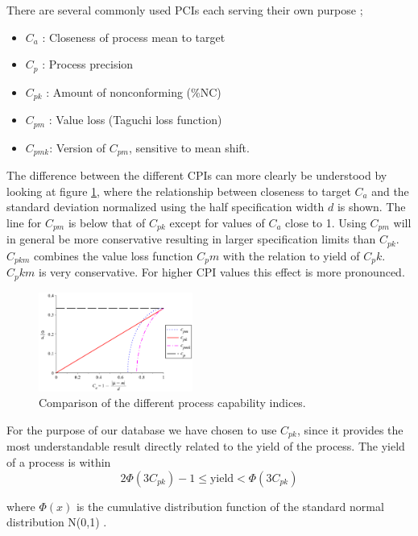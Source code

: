 \documentclass[aip,amsmath, reprint, author-year]{revtex4-1}
\begin{document}
There are several commonly used PCIs each serving their own purpose  \citep{wu2009overview, taguchi1986introduction};
\begin{itemize}
	\item $C_a$ : Closeness of process mean to target 
	\item $C_p$ : Process precision 
	\item $C_{pk}$ : Amount of nonconforming (\%NC)
	\item $C_{pm}$ : Value loss (Taguchi loss function)
	\item $C_{pmk}$: Version of $C_{pm}$,  sensitive to mean shift. 
\end{itemize}

The difference between the different CPIs can more clearly be understood by looking at figure \ref{fig:CPI}, where the relationship between closeness to target $C_a$ and the standard deviation \sigma normalized using the half specification width $d$ is shown. The line for $C_{pm}$ is below that of $C_{pk}$ except for values of $C_a$ close to 1. Using $C_{pm}$ will in general be more conservative resulting in larger specification limits than $C_{pk}$. $C_{pkm}$ combines the value loss function $C_pm$ with the relation to yield of $C_pk$. $C_pkm$ is very conservative. For higher CPI values this effect is more pronounced.


\begin{figure}
\includegraphics[width=0.45\textwidth]{cpm_cpk.pdf}
\caption{\label{fig:CPI} Comparison of the different process capability indices.  }
\end{figure}

For the purpose of our database we have chosen to use $C_{pk}$, since it provides the most understandable result directly related to the yield of the process. The yield of a process is within
\begin{equation}
	2\Phi(3C_{pk})-1 \leq \text{yield} < \Phi(3C_{pk}) \nonumber
\end{equation}

where $\Phi(x)$ is the cumulative distribution function of the standard normal distribution N(0,1) \citep{boyles1991taguchi}. 
\end{document}
